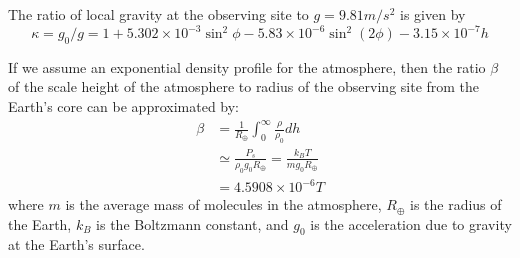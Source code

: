 \documentclass[]{article}
\begin{document}
The ratio of local gravity at the observing site to $g = 9.81 m/s^2$ is given by
\begin{equation}
\kappa = g_0/g = 1 + 5.302\times 10^{-3} \sin^2\phi - 5.83\times 10^{-6} \sin^2(2\phi) - 3.15\times 10^{-7} h \label{eqn:kappa}
\end{equation}

If we assume an exponential density profile for the atmosphere, then the ratio $\beta$ of the scale height of the atmosphere to radius of the observing site from the Earth's core can be approximated by:
\begin{align}
	\beta &= \frac{1}{R_\oplus}\int_{0}^\infty \frac{\rho}{\rho_0} dh \nonumber \\
	&\simeq \frac{P_s}{\rho_0g_0 R_\oplus} = \frac{k_BT}{m g_0 R_\oplus} \nonumber \\
	&=  4.5908\times 10^{-6} T \label{eqn:beta}
\end{align}
where $m$ is the average mass of molecules in the atmosphere, $R_\oplus$ is the radius of the Earth, $k_B$ is the Boltzmann constant, and $g_0$ is the acceleration due to gravity at the Earth's surface.



\end{document}
